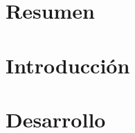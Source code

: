 \documentclass[10pt]{article}
\begin{document}
    

    \newpage

    \tableofcontents

    \newpage

    \section{Resumen}
    

    \section{Introducción}
    

    \section{Desarrollo}
    






\end{document}

